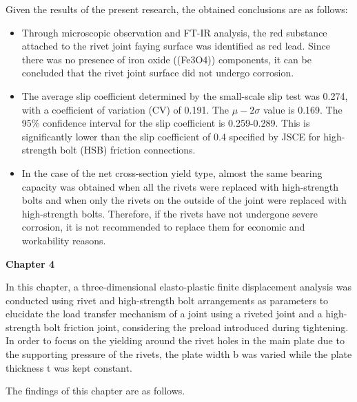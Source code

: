 Given the results of the present research, the obtained conclusions are as follows: 

\begin{itemize}
    \item Through microscopic observation and FT-IR analysis, the red substance attached to the rivet joint faying surface was identified as red lead. Since there was no presence of iron oxide ((Fe3O4)) components, it can be concluded that the rivet joint surface did not undergo corrosion.

    \item The average slip coefficient determined by the small-scale slip test was 0.274, with a coefficient of variation (CV) of 0.191. The $\mu - 2\sigma$ value is 0.169. The 95\% confidence interval for the slip coefficient is 0.259-0.289. This is significantly lower than the slip coefficient of 0.4 specified by JSCE for high-strength bolt (HSB) friction connections.
    
    \item In the case of the net cross-section yield type, almost the same bearing capacity was obtained when all the rivets were replaced with high-strength bolts and when only the rivets on the outside of the joint were replaced with high-strength bolts. Therefore, if the rivets have not undergone severe corrosion, it is not recommended to replace them for economic and workability reasons.

    
\end{itemize}

\textbf{Chapter 4}

In this chapter, a three-dimensional elasto-plastic finite displacement analysis was conducted using rivet and high-strength bolt arrangements as parameters to elucidate the load transfer mechanism of a joint using a riveted joint and a high-strength bolt friction joint, considering the preload introduced during tightening. In order to focus on the yielding around the rivet holes in the main plate due to the supporting pressure of the rivets, the plate width b was varied while the plate thickness t was kept constant.

The findings of this chapter are as follows.

